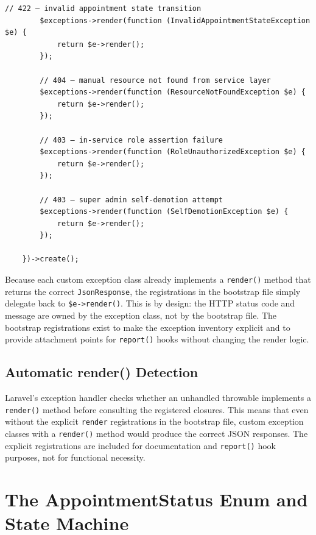 \begin{lstlisting}[style=php, caption={\texttt{bootstrap/app.php} ---
  Complete exception handler registration for all custom exception
  types and Laravel framework exceptions.}]
        // 422 — invalid appointment state transition
        $exceptions->render(function (InvalidAppointmentStateException $e) {
            return $e->render();
        });

        // 404 — manual resource not found from service layer
        $exceptions->render(function (ResourceNotFoundException $e) {
            return $e->render();
        });

        // 403 — in-service role assertion failure
        $exceptions->render(function (RoleUnauthorizedException $e) {
            return $e->render();
        });

        // 403 — super admin self-demotion attempt
        $exceptions->render(function (SelfDemotionException $e) {
            return $e->render();
        });

    })->create();
\end{lstlisting}

\begin{notebox}
  Because each custom exception class already implements a \texttt{render()}
  method that returns the correct \texttt{JsonResponse}, the registrations
  in the bootstrap file simply delegate back to \texttt{\$e->render()}.
  This is by design: the HTTP status code and message are owned by the
  exception class, not by the bootstrap file. The bootstrap registrations
  exist to make the exception inventory explicit and to provide
  attachment points for \texttt{report()} hooks without changing the
  render logic.
\end{notebox}

\subsection{Automatic render() Detection}

Laravel's exception handler checks whether an unhandled throwable
implements a \texttt{render()} method before consulting the registered
closures. This means that even without the explicit \texttt{render}
registrations in the bootstrap file, custom exception classes with a
\texttt{render()} method would produce the correct JSON responses. The
explicit registrations are included for documentation and
\texttt{report()} hook purposes, not for functional necessity.

\section{The AppointmentStatus Enum and State Machine}
\label{sec:appointment-state-machine}


